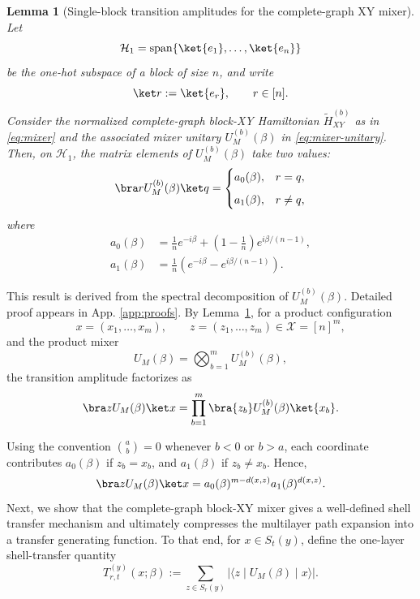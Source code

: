 \documentclass[a4paper,onecolumn,11pt,unpublished]{quantumarticle}
\newtheorem{lemma}[theorem]{Lemma}
\theoremstyle{remark}
\begin{document}
\begin{lemma}[Single-block transition amplitudes for the complete-graph XY mixer]
\label{lem:single-block-xy-amplitudes}
Let
\begin{equation}
\label{eq:one-hot-space}
\mathcal H_1=\mathrm{span}\{\ket{e_1},\dots,\ket{e_n}\}
\end{equation}
be the one-hot subspace of a block of size \(n\), and write
\[
\ket r:=\ket{e_r},\qquad r\in[n].
\]
Consider the normalized complete-graph block-XY Hamiltonian
\(
\widetilde H_{XY}^{(b)}\) as in \cref{eq:mixer} and the associated mixer unitary \(
U_M^{(b)}(\beta)\) in \cref{eq:mixer-unitary}. Then, on \(\mathcal H_1\), the matrix elements of \(U_M^{(b)}(\beta)\)
take  two values:
\[
\bra r U_M^{(b)}(\beta)\ket q
=
\begin{cases}
a_0(\beta), & r=q,\\[2mm]
a_1(\beta), & r\neq q,
\end{cases}
\]
where
\begin{align}
\label{eq:a0-single-block}
a_0(\beta)
&=
\frac{1}{n}e^{-i\beta}
+
\left(1-\frac{1}{n}\right)e^{i\beta/(n-1)},\\[1mm]
\label{eq:a1-single-block}
a_1(\beta)
&=
\frac{1}{n}
\left(
e^{-i\beta}
-
e^{i\beta/(n-1)}
\right).
\end{align}
\end{lemma}


\noindent
This result is derived from the spectral decomposition of \(U_M^{(b)}(\beta)\). Detailed proof appears in App. \ref{app:proofs}. By Lemma~\ref{lem:single-block-xy-amplitudes}, for a product configuration
\[
x=(x_1,\dots,x_m),\qquad z=(z_1,\dots,z_m)\in \mathcal X=[n]^m,
\]
and the product mixer
\[
U_M(\beta)=\bigotimes_{b=1}^m U_M^{(b)}(\beta),
\]
the transition amplitude factorizes as
\[
\bra z U_M(\beta)\ket x
=
\prod_{b=1}^m
\bra {z_b}U_M^{(b)}(\beta)\ket{x_b}.
\]

Using the convention \(\binom ab=0\) whenever \(b<0\) or \(b>a\), each coordinate contributes \(a_0(\beta)\) if \(z_b=x_b\), and \(a_1(\beta)\) if \(z_b\neq x_b\). Hence,
\begin{equation}
\label{eq:product-kernel-from-single-block}
\bra z U_M(\beta)\ket x
=
a_0(\beta)^{m-d(x,z)}
a_1(\beta)^{d(x,z)}.
\end{equation}
Next, we show that the complete-graph block-XY mixer gives a well-defined shell transfer mechanism and ultimately compresses the multilayer path expansion into a transfer generating function. To that end, for \(x\in S_t(y)\), define the one-layer shell-transfer quantity
\begin{equation}
\label{eq:Trt-def-general}
T_{r,t}^{(y)}(x;\beta)
:=
\sum_{z\in S_r(y)}
\bigl|\langle z\mid U_M(\beta)\mid x\rangle\bigr|.
\end{equation}
\end{document}
